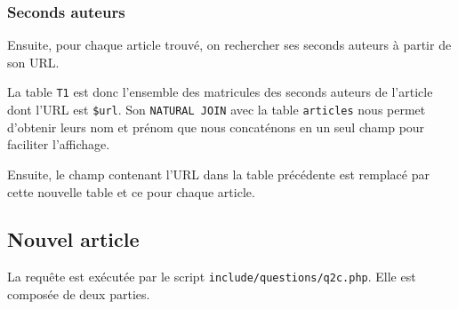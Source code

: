 \documentclass[a4paper, 12pt]{article}
\begin{document}
    \subsubsection{Seconds auteurs}
    Ensuite, pour chaque article trouvé, on rechercher ses seconds auteurs à partir de son URL. \newpage
    
    La table \texttt{T1} est donc l'ensemble des matricules des seconds auteurs de l'article dont l'URL est \texttt{\$url}. Son \texttt{NATURAL JOIN} avec la table \texttt{articles} nous permet d'obtenir leurs nom et prénom que nous concaténons en un seul champ pour faciliter l'affichage. \par
    Ensuite, le champ contenant l'URL dans la table précédente est remplacé par cette nouvelle table et ce pour chaque article.
    \subsection{Nouvel article}\label{sec:nouvel-article}
    La requête est exécutée par le script \texttt{include/questions/q2c.php}. Elle est composée de deux parties.
\end{document}
